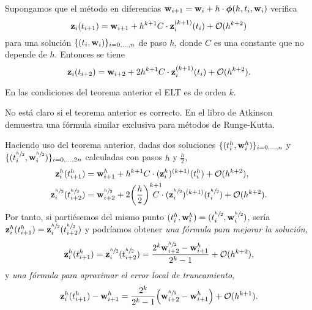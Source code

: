 \begin{theorem}
    \newcommand{\hh}{\sfrac{h}{2}}

    Supongamos que el método en diferencias 
    $\vb{w}{}_{i+1} = \vb{w}{}_i + h\cdot \vb*{\phi}{}(h, t_i, \vb{w}{}_i)$
    verifica
    \begin{equation*}\label{eq7}
        \vb{z}{}_i(t_{i+1}) =
        \vb{w}{}_{i+1} + h^{k+1}C\cdot \vb{z}{}_i^{(k+1)}(t_i) + \vb{\mathcal{O}}{}(h^{k+2})
    \end{equation*}
    para una solución $\{(t_i, \vb{w}{}_i)\}_{i = 0,\ldots,n}$ de paso $h$,
    donde $C$ es una constante que no depende de $h$.
    Entonces se tiene
    \begin{equation*}\label{eq8}
        \vb{z}{}_i(t_{i+2}) =
        \vb{w}{}_{i+2} + 2h^{k+1}C\cdot \vb{z}{}_i^{(k+1)}(t_i) + \vb{\mathcal{O}}{}(h^{k+2}).
    \end{equation*}
\end{theorem}

\begin{remark}
    En las condiciones del teorema anterior el ELT es de orden $k$.
\end{remark}

\begin{editorial}
    No está claro si el teorema anterior es correcto.
    En el libro de Atkinson demuestra una fórmula similar
    exclusiva para métodos de Runge-Kutta.
\end{editorial}

\newcommand{\hh}{\sfrac{h}{2}}

Haciendo uso del teorema anterior, dadas dos soluciones
$\{(t^h_i, \vb{w}{}^h_i)\}_{i = 0,\ldots,n}$ y
$\{(t^{\hh}_i, \vw^{\hh}_i)\}_{i = 0,\ldots,2n}$
calculadas con pasos $h$ y $\frac{h}{2}$,
\begin{align*}\label{eq8}
    \vz^{h}_i(t^{h}_{i+1}) &=
    \vw^{h}_{i+1} + h^{k+1}C\cdot (\vz^{h}_i)^{(k+1)}(t^{h}_i)
        + \vo(h^{k+2}), \\
    \vz^{\hh}_i(t^{\hh}_{i+2}) &=
    \vw^{\hh}_{i+2} + 2\qty(\frac{h}{2})^{k+1} \hspace{-4mm} C\cdot
        (\vz^{\hh}_i)^{(k+1)}(t^{\hh}_i) + \vo(h^{k+2}).
\end{align*}
Por tanto, si partiésemos del mismo punto
$(t^h_i, \vw^h_i) = (t^{\hh}_i, \vw^{\hh}_i)$,
sería $\vz^h_i(t^h_{i+1}) = \vz^{\hh}_i(t^{\hh}_{i+2})$
y podríamos obtener \emph{una fórmula para mejorar la solución},
\begin{equation*}
    \vz^h_i(t^h_{i+1}) = \vz^{\hh}_i(t^{\hh}_{i+2}) =
    \frac{2^k\vw^{\hh}_{i+2} - \vw^h_{i+1}}{2^k - 1} + \vo(h^{k+2}),
\end{equation*}
y \emph{una fórmula para aproximar el error local de truncamiento},
\begin{equation*}
    \vz^h_i(t^h_{i+1}) - \vw^h_{i+1} =
    \frac{2^k}{2^k-1}\qty(\vw^{\hh}_{i+2} - \vw^h_{i+1}) + \vo(h^{k+1}).
\end{equation*}

